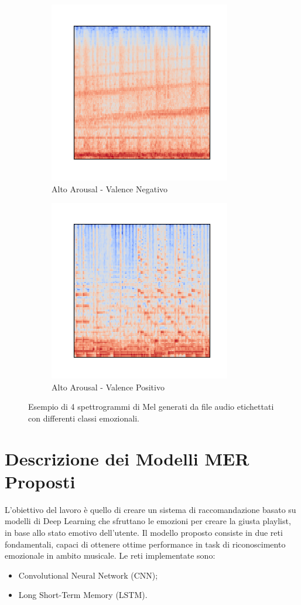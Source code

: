 \documentclass[11pt]{report}
\begin{document}
\begin{figure}
		\begin{subfigure}[t]{.45\textwidth}
         \centering
         \includegraphics[scale = 0.8]{img/Mel-2.png}
         \caption{Alto Arousal - Valence Negativo}
	\end{subfigure}
	\quad
	\begin{subfigure}[t]{.45\textwidth}
		\centering
        \includegraphics[scale = 0.8]{img/Mel-3.png}
        \caption{Alto Arousal - Valence Positivo}
	\end{subfigure}
	\caption{Esempio di 4 spettrogrammi di Mel generati da file audio etichettati con differenti classi emozionali.}
	\label{fig-spectrogram}
\end{figure}



\chapter{Descrizione dei Modelli MER Proposti}

L'obiettivo del lavoro è quello di creare un sistema di raccomandazione basato su modelli di Deep Learning che sfruttano le emozioni per creare la giusta playlist, in base allo stato emotivo dell'utente. Il modello proposto consiste in due reti fondamentali, capaci di ottenere ottime performance in task di riconoscimento emozionale in ambito musicale. Le reti implementate sono:
\begin{itemize}
    \item Convolutional Neural Network (CNN);
    \item Long Short-Term Memory (LSTM).
\end{itemize}
\end{document}
